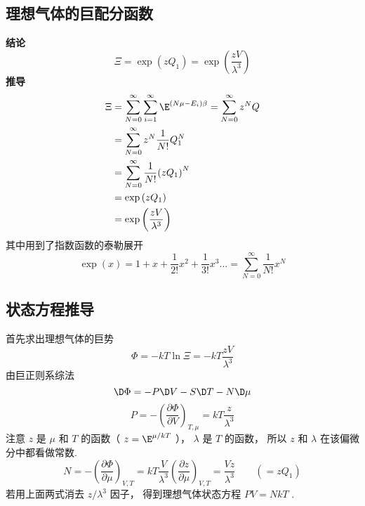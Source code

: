
\subsection{理想气体的巨配分函数}
\noindent\textbf{结论}
  \begin{equation}\label{IdMCE_eq1}
    \Xi  = \exp \left( {z{Q_1}} \right) = \exp \left( {\frac{{zV}}{{{\lambda ^3}}}} \right)
  \end{equation}
  \textbf{推导}
  \begin{equation}\label{IdMCE_eq2}
    \begin{aligned}
\Xi & = \sum\limits_{N = 0}^\infty  {\sum\limits_{i = 1}^\infty  {{\E^{\left( {N\mu  - {E_i}} \right)\beta }}} }  = \sum\limits_{N = 0}^\infty  {{z^N}Q} \\
 & = \sum\limits_{N = 0}^\infty  {{z^N}\frac{1}{{N!}}Q_1^N} \\
 & = \sum\limits_{N = 0}^\infty  {\frac{1}{{N!}}{{\left( {z{Q_1}} \right)}^N}} \\
 & = \exp \left( {z{Q_1}} \right) \\
 & = \exp \left( {\frac{{zV}}{{{\lambda ^3}}}} \right){\kern 1pt} {\kern 1pt} {\kern 1pt} {\kern 1pt} {\kern 1pt} {\kern 1pt} {\kern 1pt}
\end{aligned}
  \end{equation}
  其中用到了指数函数的泰勒展开%
  \begin{equation}\label{IdMCE_eq3}
  \exp \left( x \right) = 1 + x + \frac{1}{{2!}}{x^2} + \frac{1}{{3!}}{x^3}... = \sum\limits_{N = 0}^\infty  {\frac{1}{{N!}}{x^N}}
  \end{equation}

\subsection{状态方程推导}
  首先求出理想气体的巨势
  \begin{equation}\label{IdMCE_eq4}
    \Phi  =  - kT\ln \Xi  =  - kT\frac{{zV}}{{{\lambda ^3}}}
  \end{equation}
  由巨正则系综法%
  \begin{equation}\label{IdMCE_eq5}
    \D \Phi  =  - P \D V - S \D T - N \D \mu
  \end{equation}
  \begin{equation}\label{IdMCE_eq6}
    P =  - {\left( {\frac{{\partial \Phi }}{{\partial V}}} \right)_{T,\mu }} = kT\frac{z}{{{\lambda ^3}}}
  \end{equation}
  注意 $z$ 是 $\mu $ 和 $T$ 的函数（ $z = {\E^{{\mu }/{{kT}}}}$ ）， $\lambda $ 是 $T$ 的函数， 所以 $z$ 和 $\lambda $ 在该偏微分中都看做常数.
  \begin{equation}\label{IdMCE_eq7}
  N =  - {\left( {\frac{{\partial \Phi }}{{\partial \mu }}} \right)_{V,T}} = kT\frac{V}{{{\lambda ^3}}}{\left( {\frac{{\partial z}}{{\partial \mu }}} \right)_{V,T}} = \frac{{Vz}}{{{\lambda ^3}}} 
  \qquad
  ( = z{Q_1})
  \end{equation}
若用上面两式消去 ${z}/{{{\lambda ^3}}}$ 因子， 得到理想气体状态方程 $PV = NkT$ .
  
